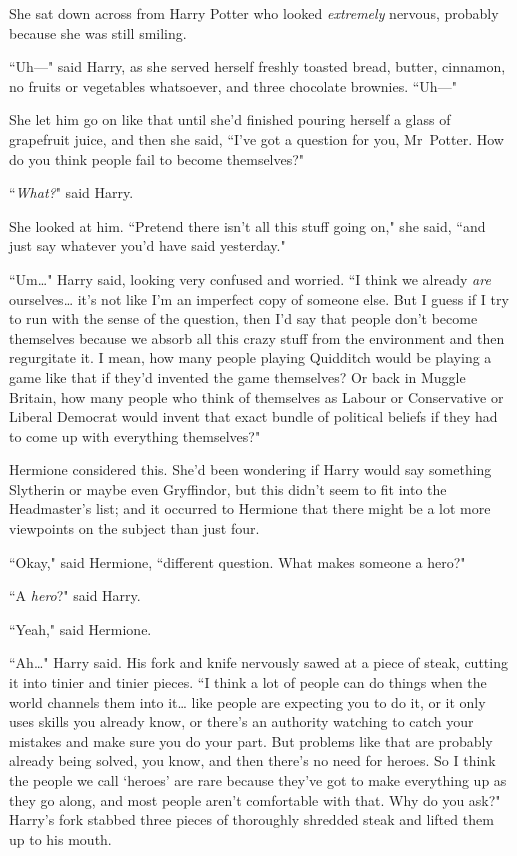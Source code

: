 She sat down across from Harry Potter who looked \emph{extremely} nervous, probably because she was still smiling.

``Uh—" said Harry, as she served herself freshly toasted bread, butter, cinnamon, no fruits or vegetables whatsoever, and three chocolate brownies. ``Uh—"

She let him go on like that until she'd finished pouring herself a glass of grapefruit juice, and then she said, ``I've got a question for you, Mr~Potter. How do you think people fail to become themselves?"

``\emph{What?}" said Harry.

She looked at him. ``Pretend there isn't all this stuff going on," she said, ``and just say whatever you'd have said yesterday."

``Um{\ldots}" Harry said, looking very confused and worried. ``I think we already \emph{are} ourselves{\ldots} it's not like I'm an imperfect copy of someone else. But I guess if I try to run with the sense of the question, then I'd say that people don't become themselves because we absorb all this crazy stuff from the environment and then regurgitate it. I mean, how many people playing Quidditch would be playing a game like that if they'd invented the game themselves? Or back in Muggle Britain, how many people who think of themselves as Labour or Conservative or Liberal Democrat would invent that exact bundle of political beliefs if they had to come up with everything themselves?"

Hermione considered this. She'd been wondering if Harry would say something Slytherin or maybe even Gryffindor, but this didn't seem to fit into the Headmaster's list; and it occurred to Hermione that there might be a lot more viewpoints on the subject than just four.

``Okay," said Hermione, ``different question. What makes someone a hero?"

``A \emph{hero}?" said Harry.

``Yeah," said Hermione.

``Ah{\ldots}" Harry said. His fork and knife nervously sawed at a piece of steak, cutting it into tinier and tinier pieces. ``I think a lot of people can do things when the world channels them into it{\ldots} like people are expecting you to do it, or it only uses skills you already know, or there's an authority watching to catch your mistakes and make sure you do your part. But problems like that are probably already being solved, you know, and then there's no need for heroes. So I think the people we call `heroes' are rare because they've got to make everything up as they go along, and most people aren't comfortable with that. Why do you ask?" Harry's fork stabbed three pieces of thoroughly shredded steak and lifted them up to his mouth.

